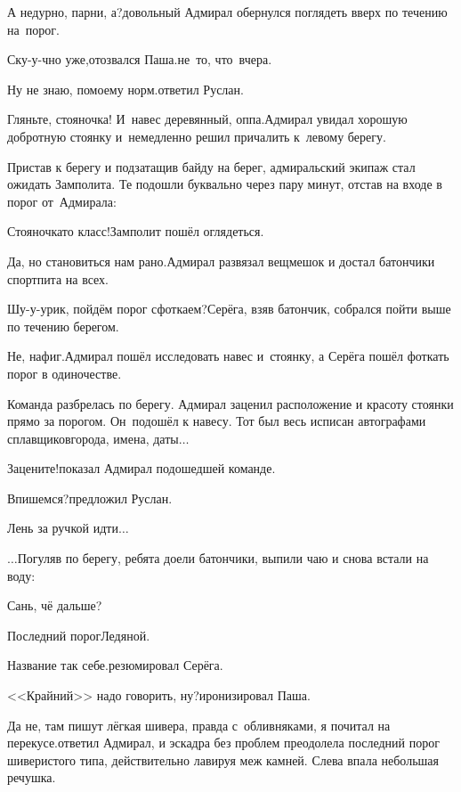 \diagdash А недурно, парни, а?\mdash довольный Адмирал обернулся поглядеть вверх по течению на~порог.

\diagdash Ску-у-чно уже,\mdash отозвался Паша.\mdash не~то, что~вчера.

\diagdash Ну не знаю, по\sdash моему норм.\mdash ответил Руслан.

\diagdash Гляньте, стояночка! И~навес деревянный, оп\sdash па.\mdash Адмирал увидал хорошую добротную стоянку и~немедленно решил причалить к~левому берегу.

Пристав к берегу и подзатащив байду на берег, адмиральский экипаж стал ожидать Замполита. Те подошли буквально через пару минут, отстав на входе в порог от~Адмирала:

\diagdash Стояночка\sdash то класс!\mdash Замполит пошёл оглядеться.

\diagdash Да, но становиться нам рано.\mdash Адмирал развязал вещмешок и достал батончики спортпита на всех.

\diagdash Шу-у-урик, пойдём порог сфоткаем?\mdash Серёга, взяв батончик, собрался пойти выше по течению берегом.

\diagdash Не, нафиг.\mdash Адмирал пошёл исследовать навес и~стоянку, а Серёга пошёл фоткать порог в одиночестве. 

Команда разбрелась по берегу. Адмирал заценил расположение и красоту стоянки прямо за порогом. Он~подошёл к навесу. Тот был весь исписан автографами сплавщиков\mdash города, имена, даты$\ldots$

\diagdash Зацените!\mdash показал Адмирал подошедшей команде.

\diagdash Впишемся?\mdash предложил Руслан.

\diagdash Лень за ручкой идти$\ldots$

\vspace{0.5cm}
$\ldots$Погуляв по берегу, ребята доели батончики, выпили чаю и снова встали на воду:

\diagdash Сань, чё дальше?

\diagdash Последний порог\mdash Ледяной.

\diagdash Название так себе.\mdash резюмировал Серёга.

\diagdash <<Крайний>> надо говорить, ну?\mdash иронизировал Паша.

\diagdash Да не, там пишут лёгкая шивера, правда с~обливняками, я почитал на перекусе.\mdash ответил Адмирал, и эскадра без проблем преодолела последний порог шиверистого типа, действительно лавируя меж камней. Слева впала небольшая речушка.

